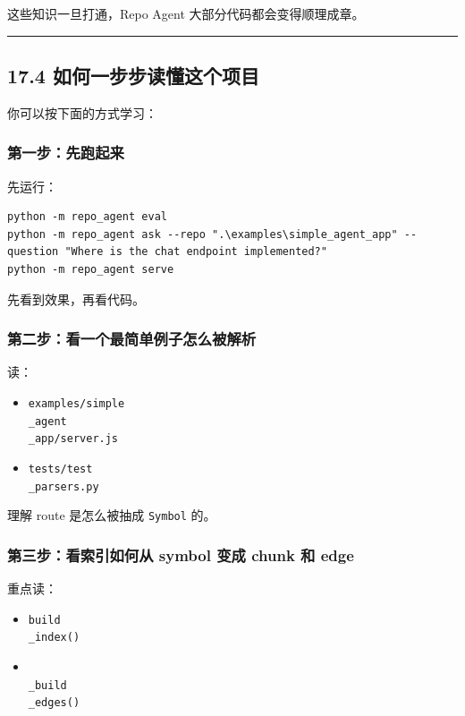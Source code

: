 \documentclass[UTF8,12pt,openany]{ctexbook}
\begin{document}
这些知识一旦打通，Repo Agent 大部分代码都会变得顺理成章。\par

\hrule

\subsection{17.4 如何一步步读懂这个项目}

你可以按下面的方式学习：\par

\subsubsection{第一步：先跑起来}

先运行：\par

\begin{lstlisting}
python -m repo_agent eval
python -m repo_agent ask --repo ".\examples\simple_agent_app" --question "Where is the chat endpoint implemented?"
python -m repo_agent serve
\end{lstlisting}

先看到效果，再看代码。\par

\subsubsection{第二步：看一个最简单例子怎么被解析}

读：\par

\begin{itemize}
\item \texttt{examples/simple\\_agent\\_app/server.js}
\item \texttt{tests/test\\_parsers.py}
\end{itemize}

理解 route 是怎么被抽成 \texttt{Symbol} 的。\par

\subsubsection{第三步：看索引如何从 symbol 变成 chunk 和 edge}

重点读：\par

\begin{itemize}
\item \texttt{build\\_index()}
\item \texttt{\\_build\\_edges()}
\end{itemize}
\end{document}
